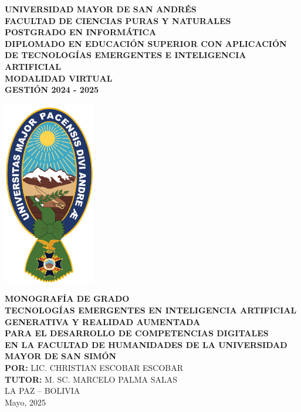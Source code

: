 \documentclass[11pt,oneside,letterpaper]{book}
\begin{document}
	\thispagestyle{empty}
	\begin{center}
		\Large{\textbf{UNIVERSIDAD MAYOR DE SAN ANDRÉS}} \\
		\large{\textbf{FACULTAD DE CIENCIAS PURAS Y NATURALES}} \\
		\large{\textbf{POSTGRADO EN INFORMÁTICA}} \\
		\vspace{0.5cm}
		\large{\textbf{DIPLOMADO EN EDUCACIÓN SUPERIOR CON APLICACIÓN DE TECNOLOGÍAS EMERGENTES E INTELIGENCIA ARTIFICIAL}} \\
		\large{\textbf{MODALIDAD VIRTUAL}} \\
		\large{\textbf{GESTIÓN 2024 - 2025}} \\
		\begin{center}
			\includegraphics[width=4cm]{logo_umsa.png}
		\end{center}
		\vspace{0.5cm}
		\large{\textbf{MONOGRAFÍA DE GRADO}} \\
		\large{\textbf{TECNOLOGÍAS EMERGENTES EN INTELIGENCIA ARTIFICIAL GENERATIVA Y REALIDAD AUMENTADA}} \\
		\large{\textbf{PARA EL DESARROLLO DE COMPETENCIAS DIGITALES}} \\
		\large{\textbf{EN LA FACULTAD DE HUMANIDADES DE LA UNIVERSIDAD MAYOR DE SAN SIMÓN}} \\
		\vspace{0.5cm}
		\textbf{POR:} LIC. CHRISTIAN ESCOBAR ESCOBAR \\
		\textbf{TUTOR:} M. SC. MARCELO PALMA SALAS \\
		LA PAZ – BOLIVIA \\
		Mayo, 2025
	\end{center}
\end{document}
